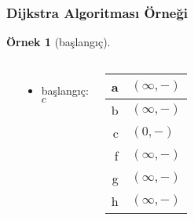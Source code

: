 \documentclass[dvipsnames]{beamer}
\theoremstyle{definition}
\theoremstyle{example}
\newtheorem{ornek}[theorem]{Örnek}
\theoremstyle{plain}
\begin{document}
\begin{frame}
  \frametitle{Dijkstra Algoritması Örneği}

  \begin{ornek}[başlangıç]
    \begin{columns}
      \begin{center}
      \end{center}

      \begin{itemize}
        \item başlangıç: $c$
      \end{itemize}

      \begin{table}
        \begin{tabular}{r|l}
          a & $(\infty,-)$ \\\hline
          b & $(\infty,-)$ \\\hline
          c & $(0,-)$      \\\hline
          f & $(\infty,-)$ \\\hline
          g & $(\infty,-)$ \\\hline
          h & $(\infty,-)$
        \end{tabular}
      \end{table}
    \end{columns}
  \end{ornek}
\end{frame}
\end{document}
